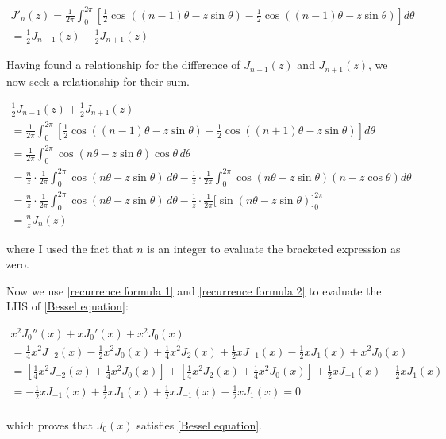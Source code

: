 \documentclass{article}
\begin{document}
\begin{equation}
\label{recurrence formula 1}
\begin{gathered}
J'_n(z) = \frac{1}{2\pi}\int_0^{2\pi} \left[ \frac{1}{2}\cos\left((n-1)\theta - z\sin\theta \right) - \frac{1}{2}\cos\left((n-1)\theta - z\sin\theta \right) \right] d\theta \\
= \frac{1}{2} J_{n-1}(z) - \frac{1}{2}J_{n+1}(z)
\end{gathered}
\end{equation}

Having found a relationship for the difference of $J_{n-1}(z)$ and $J_{n+1}(z)$, we now seek a relationship for their sum.

\begin{equation}
\label{recurrence formula 2}
\begin{gathered}
\frac{1}{2} J_{n-1}(z) + \frac{1}{2}J_{n+1}(z) \\
= \frac{1}{2\pi}\int_0^{2\pi} \left[ \frac{1}{2}\cos\left((n-1)\theta - z\sin\theta \right) + \frac{1}{2}\cos\left((n+1)\theta - z\sin\theta \right) \right] d\theta \\
= \frac{1}{2\pi}\int_0^{2\pi} \cos(n\theta - z\sin\theta) \cos\theta \, d\theta \\
= \frac{n}{z}\cdot\frac{1}{2\pi}\int_0^{2\pi} \cos(n\theta - z\sin\theta) \, d\theta
  - \frac{1}{z}\cdot\frac{1}{2\pi}\int_0^{2\pi} \cos(n\theta - z\sin\theta) \left(n - z\cos\theta \right) d\theta \\
= \frac{n}{z}\cdot\frac{1}{2\pi}\int_0^{2\pi} \cos(n\theta - z\sin\theta) \, d\theta
  - \frac{1}{z}\cdot\frac{1}{2\pi}\biggl[ \sin(n\theta - z\sin\theta) \biggr]_0^{2\pi} \\
= \frac{n}{z} J_n(z)
\end{gathered}
\end{equation}

where I used the fact that $n$ is an integer to evaluate the bracketed expression as zero.

Now we use
\eqref{recurrence formula 1}
and \eqref{recurrence formula 2}
to evaluate the LHS of \eqref{Bessel equation}:

\begin{equation}
\begin{gathered}
x^2 J_0''(x) + xJ_0'(x) + x^2J_0(x) \\
= \frac{1}{4}x^2 J_{-2}(x) - \frac{1}{2}x^2J_0(x) + \frac{1}{4}x^2 J_{2}(x) + \frac{1}{2}x J_{-1}(x) - \frac{1}{2} x J_{1}(x) + x^2 J_0(x) \\
= \left[ \frac{1}{4}x^2 J_{-2}(x) + \frac{1}{4}x^2J_0(x) \right] + \left[\frac{1}{4}x^2 J_{2}(x) + \frac{1}{4}x^2J_0(x)\right]+ \frac{1}{2}x J_{-1}(x) - \frac{1}{2} x J_{1}(x) \\
= - \frac{1}{2}x J_{-1}(x) + \frac{1}{2}x J_{1}(x) + \frac{1}{2}x J_{-1}(x) - \frac{1}{2} x J_{1}(x) = 0 \\
\end{gathered}
\end{equation}

which proves that $J_0(x)$ satisfies \eqref{Bessel equation}.
\end{document}
